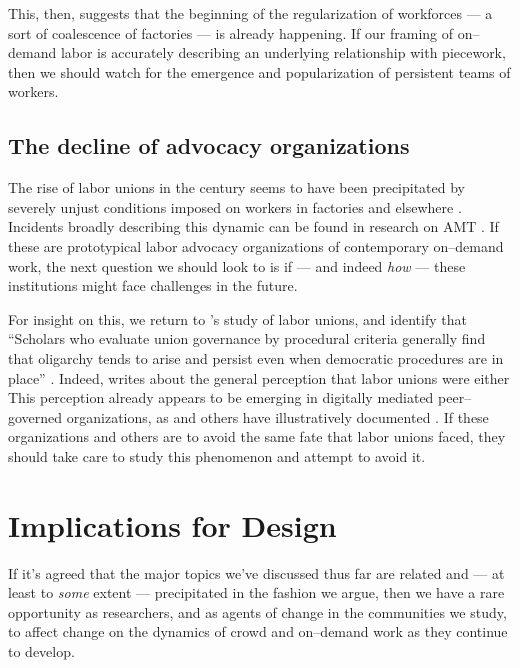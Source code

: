 \documentclass[chi_draft]{sigchi}
\begin{document}
{  This, then, suggests that the beginning of the regularization of workforces
  --- a sort of coalescence of factories ---
  is already happening.
  If our framing of on--demand labor is accurately describing an underlying relationship with piecework,
  then we should watch for the emergence and popularization of persistent teams of workers.

  \subsection{The decline of advocacy organizations}
  The rise of labor unions in the  century seems to have been precipitated by
  severely unjust conditions imposed on workers in factories and elsewhere
  \cite{ebbinghaus1999institutions}.
  Incidents broadly describing this dynamic can be found in research on AMT
  \cite{turkopticon,dynamo}.
  If these are prototypical labor advocacy organizations of contemporary on--demand work,
  the next question we should look to is if
  --- and indeed \textit{how} ---
  these institutions might face challenges in the future.

  For insight on this, we return to \citeyear{levi2009union}'s study of labor unions,
  and identify that
  ``Scholars who evaluate union governance by procedural criteria generally find that oligarchy tends to arise and persist even when democratic procedures are in place''
  \cite{levi2009union}.
  Indeed, \citeauthor{levi2009union} writes about the general perception that labor unions were either
  This perception already appears to be emerging in digitally mediated peer--governed organizations,
  as \citeauthor{keegan2010egalitarians} and others have illustratively documented
  \cite{beschastnikh2008wikipedian,keegan2010egalitarians}.
  If these organizations and others are to avoid the same fate that labor unions faced,
  they should take care to study this phenomenon and attempt to avoid it.

  \section{Implications for Design}
  If it's agreed that
  the major topics we've discussed thus far are related and
  --- at least to \textit{some} extent ---
  precipitated in the fashion we argue,
  then we have a rare opportunity as researchers,
  and as agents of change in the communities we study,
  to affect change on the dynamics of crowd and on--demand work
  as they continue to develop.

}
\end{document}
